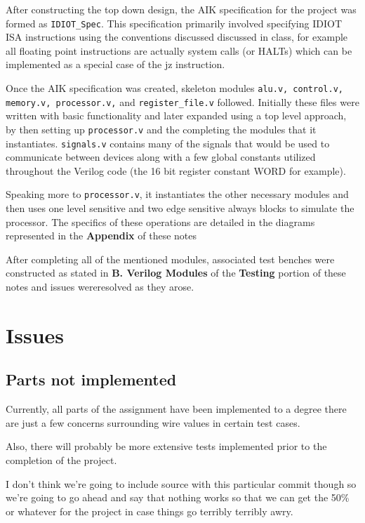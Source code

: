 \documentclass[conference]{IEEEtran}
\begin{document}
After constructing the top down design, the AIK specification
for the project was formed as \texttt{IDIOT\_Spec}. This specification primarily involved specifying IDIOT ISA 
instructions using the conventions discussed discussed in class, for example all
floating point instructions are actually system calls (or HALTs) which can be implemented as a special case of the jz instruction. 

Once the AIK specification was created, skeleton modules \texttt{alu.v, control.v,
memory.v, processor.v,} and \texttt{register\_file.v} followed. Initially these files were 
written with basic functionality and later expanded using a top level approach,
by then setting up \texttt{processor.v} and the completing the modules that it
instantiates. \texttt{signals.v} contains many of the signals that would be used  to communicate 
between devices along with a few global constants utilized throughout the 
Verilog code (the 16 bit register constant WORD for example).

Speaking more to \texttt{processor.v}, it instantiates the other necessary modules
and then uses one level sensitive  and two edge sensitive always blocks to 
simulate the processor. The specifics of these operations are detailed 
in the diagrams represented in the \textbf{Appendix} of these notes
 
After completing all of the mentioned modules, associated test benches were 
constructed as stated in \textbf{B. Verilog Modules} of the \textbf{Testing} portion
of these notes and issues wereresolved as they arose.
 


\section{Issues}
\subsection{Parts not implemented}
Currently, all parts of the assignment have been implemented to a degree 
there are just a few concerns surrounding wire values in certain test cases.

Also, there will probably be more extensive tests implemented prior to the 
completion of the project.

I don't think we're going to include source with this particular commit though
so we're going to go ahead and say that nothing works so that we can get 
the 50\% or whatever for the project in case things go terribly terribly awry. 
 
\end{document}
